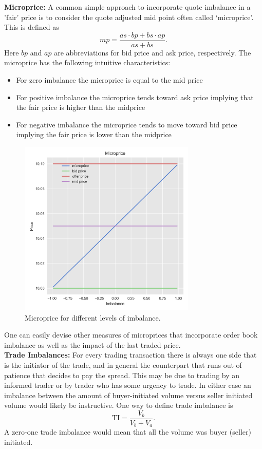 \noindent\textbf{Microprice:} A common simple approach to incorporate quote imbalance in a 'fair' price is to consider the quote adjusted mid point often called `microprice'. This is defined as
	\begin{equation}\label{eqn:microprice}
		mp=\frac{as \cdot bp + bs \cdot ap}{as+bs}.
	\end{equation}
Here $bp$ and $ap$ are abbreviations for bid price and ask price, respectively. The microprice has the following intuitive characteristics: 
	\begin{itemize}
	\item For zero imbalance the microprice is equal to the mid price
	\item For positive imbalance the microprice tends toward ask price implying that the fair price is higher than the midprice
	\item For negative imbalance the microprice tends to move toward bid price implying the fair price is lower than the midprice
\end{itemize}
	\begin{figure}[!ht]
		\centering
			\includegraphics[width=0.75\textwidth]{chapters/chapter_trade_data_models/figures/microprice.png} 
		\caption{Microprice for different levels of imbalance. \label{fig:microprice}}
	\end{figure}

One can easily devise other measures of microprices that incorporate order book imbalance as well as the impact of the last traded price. \\


\noindent\textbf{Trade Imbalances:} For every trading transaction there is always one side that is the initiator of the trade, and in general the counterpart that runs out of patience that decides to pay the spread. This may be due to trading by an informed trader or by trader who has some urgency to trade. In either case an imbalance between the amount of buyer-initiated volume versus seller initiated volume would likely be instructive. One way to define trade imbalance is
	\begin{equation}\label{eq:vbs}
	\text{TI}=\frac{V_b}{V_b+V_a}.
	\end{equation} 
A zero-one trade imbalance would mean that all the volume was buyer (seller) initiated. 


